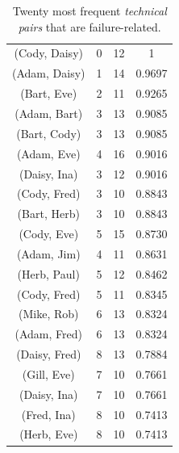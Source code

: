 \begin{table}[t]
\begin{tabular}{@{\hspace{.2cm}}ccc@{\hspace{.75cm}}c@{\hspace{.2cm}}}
%
(Cody, Daisy)	&	0&	12&	1		\\ %
(Adam, Daisy)	&	1&	14&	0.9697	\\ %
(Bart, Eve)	&	2&	11&	0.9265	\\ %
(Adam, Bart)	&	3&	13&	0.9085	\\ %
(Bart, Cody)	&	3&	13&	0.9085	\\ %
(Adam, Eve)	&	4&	16&	0.9016	\\ %
(Daisy, Ina)	&	3&	12&	0.9016	\\ %
(Cody, Fred)	&	3&	10&	0.8843	\\ %
(Bart, Herb)	&	3&	10&	0.8843	\\ %
(Cody, Eve)	&	5&	15&	0.8730	\\ %
(Adam, Jim)	&	4&	11&	0.8631	\\ %
(Herb, Paul)	&	5&	12&	0.8462	\\ %
(Cody, Fred)	&	5&	11&	0.8345	\\ %
(Mike, Rob)	&	6&	13&	0.8324	\\ %
(Adam, Fred)	&	6&	13&	0.8324	\\ %
(Daisy, Fred)	&	8&	13&	0.7884	\\ %
(Gill, Eve)		&	7&	10&	0.7661	\\ %
(Daisy, Ina)	&	7&	10&	0.7661	\\ %
(Fred, Ina)	&	8&	10&	0.7413	\\ %
(Herb, Eve)	&	8&	10&	0.7413	\\ %
\bottomrule
\end{tabular}
\caption{Twenty most frequent \emph{technical pairs} that are failure-related.}
\label{tab:badtechpairs}
\end{table}
%

